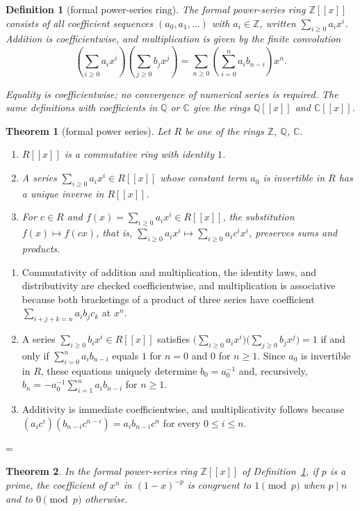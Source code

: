 \documentclass[11pt]{article}
\makeatletter
\theoremstyle{ntstyle}
\newtheorem{theorem}{Theorem}[subsection]
\newtheorem{definition}{Definition}[subsection]
\let\nt@closedisplay\]
\def\nt@guardedclose{\@ifnextchar\par{\nt@closeafterpar}{\@ifnextchar\end{\postdisplaypenalty\@M\nt@closedisplay}{\nt@closedisplay}}}
\def\nt@closeafterpar\par{\@ifnextchar\par{\nt@closeafterpar}{\@ifnextchar\end{\postdisplaypenalty\@M\nt@closedisplay\par}{\nt@closedisplay\par}}}
\renewenvironment{proof}[1][\proofname]{\par
  \pushQED{\qed}\normalfont\topsep\medskipamount\edef\nt@afterproof{\@endparpenalty=\the\@endparpenalty\relax}\@beginparpenalty\@M\@endparpenalty\@M\let\]\nt@guardedclose\trivlist\item[]\textit{#1\@addpunct{.}} \ignorespaces}{\ifvmode\addpenalty\@M\fi\popQED\nt@afterproof\endtrivlist\@endpefalse}
\makeatother
\begin{document}
\begin{definition}[formal power-series ring]\label{def:3.5.2} The
	formal power-series ring $\mathbb{Z}[[x]]$ consists of all coefficient
	sequences $(a_0,a_1,\ldots)$ with $a_i\in\mathbb{Z}$, written
	$\sum_{i\ge0}a_ix^i$. Addition is coefficientwise, and multiplication is
	given by the finite convolution
	\[
		\left(\sum_{i\ge0}a_ix^i\right)\left(\sum_{j\ge0}b_jx^j\right)
		=\sum_{n\ge0}\left(\sum_{i=0}^{n}a_i b_{n-i}\right)x^n.
	\]

	Equality is coefficientwise; no convergence of numerical series is required.
	The same definitions with coefficients in $\mathbb{Q}$ or $\mathbb{C}$ give the rings
	$\mathbb{Q}[[x]]$ and $\mathbb{C}[[x]]$.
\end{definition}
\begin{theorem}[formal power series]\label{thm:3.5.10}
	Let $R$ be one of the rings $\mathbb{Z}$, $\mathbb{Q}$, $\mathbb{C}$.

	\begin{enumerate}[label={\alph*)}]
		\item $R[[x]]$ is a commutative ring with identity $1$.
		\item A series $\sum_{i\ge0}a_ix^i\in R[[x]]$ whose constant term $a_0$ is
					invertible in $R$ has a unique inverse in $R[[x]]$.
		\item For $c\in R$ and $f(x)=\sum_{i\ge0}a_ix^i\in R[[x]]$, the substitution $f(x)\mapsto f(cx)$, that is,
					$\sum_{i\ge0}a_ix^i\mapsto\sum_{i\ge0}a_ic^ix^i$, preserves sums and products.
	\end{enumerate}
\end{theorem}

\begin{proof}
	\begin{enumerate}[label={\alph*)}]
		\item Commutativity of addition and multiplication, the identity laws, and distributivity are
		checked coefficientwise, and
					multiplication is associative because both bracketings of a product of
					three series have coefficient $\sum_{i+j+k=n}a_ib_jc_k$ at $x^n$.
		\item A series $\sum_{i\ge0}b_ix^i\in R[[x]]$ satisfies
					$\big(\sum_{i\ge0}a_ix^i\big)\big(\sum_{j\ge0}b_jx^j\big)=1$ if and only if
					$\sum_{i=0}^{n}a_ib_{n-i}$ equals $1$ for $n=0$ and $0$ for $n\ge1$.
					Since $a_0$ is invertible in $R$, these equations uniquely determine $b_0=a_0^{-1}$ and, recursively,
					$b_n=-a_0^{-1}\sum_{i=1}^{n}a_ib_{n-i}$ for $n\ge1$.
		\item Additivity is immediate coefficientwise, and multiplicativity follows because
					$(a_ic^i)(b_{n-i}c^{n-i})=a_ib_{n-i}c^n$ for every $0\le i\le n$.\qedhere
	\end{enumerate}
\end{proof}
\begin{theorem}\label{thm:3.5.11} In the formal power-series ring
	$\mathbb{Z}[[x]]$ of Definition~\ref{def:3.5.2}, if $p$ is a prime, the coefficient of $x^n$ in
	$(1-x)^{-p}$ is congruent to $1 \pmod{p}$ when $p\mid n$ and to $0 \pmod{p}$ otherwise.
\end{theorem}
\end{document}
